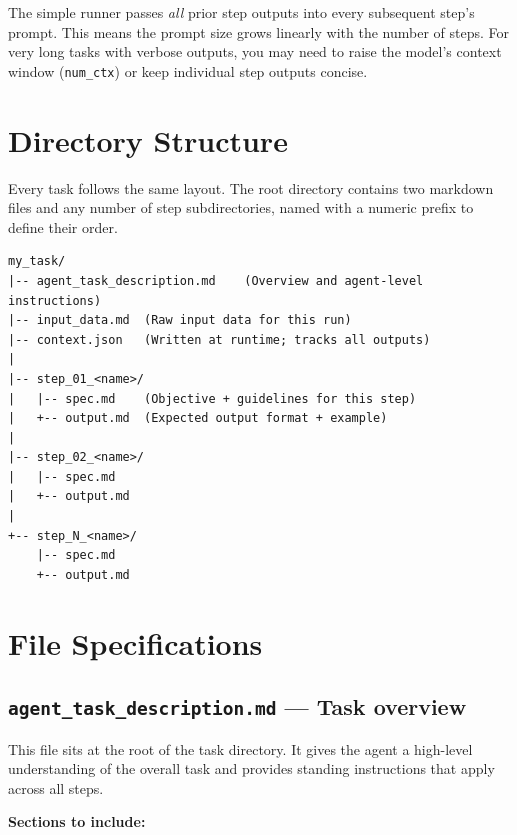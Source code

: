 \documentclass[12pt, a4paper]{article}
\begin{document}
\begin{warnbox}
The simple runner passes \textit{all} prior step outputs into every subsequent step's prompt. This means the prompt size grows linearly with the number of steps. For very long tasks with verbose outputs, you may need to raise the model's context window (\texttt{num\_ctx}) or keep individual step outputs concise.
\end{warnbox}

\section{Directory Structure}

Every task follows the same layout. The root directory contains two markdown files and any number of step subdirectories, named with a numeric prefix to define their order.

\begin{lstlisting}
my_task/
|-- agent_task_description.md    (Overview and agent-level instructions)
|-- input_data.md  (Raw input data for this run)
|-- context.json   (Written at runtime; tracks all outputs)
|
|-- step_01_<name>/
|   |-- spec.md    (Objective + guidelines for this step)
|   +-- output.md  (Expected output format + example)
|
|-- step_02_<name>/
|   |-- spec.md
|   +-- output.md
|
+-- step_N_<name>/
    |-- spec.md
    +-- output.md
\end{lstlisting}

\section{File Specifications}

\subsection{\texttt{agent\_task\_description.md} --- Task overview}

This file sits at the root of the task directory. It gives the agent a high-level understanding of the overall task and provides standing instructions that apply across all steps.

\textbf{Sections to include:}
\end{document}
